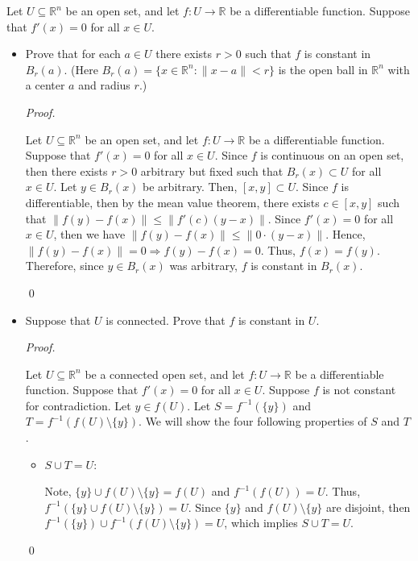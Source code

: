 \documentclass[12pt]{article}
\newenvironment{problem}[2][Problem]{\begin{trivlist}
\item[\hskip \labelsep {\bfseries #1}\hskip \labelsep {\bfseries
#2.}]}{\end{trivlist}}
\newenvironment{sol}
    {\emph{Proof.}
    }
    {
    \qed
    }
\begin{document}
  
  
  \begin{problem}{14}
  Let $U \subseteq \mathbb{R}^n$ be an open set, and let $f : U \to \mathbb{R}$ be a differentiable function. Suppose that $f'(x) = 0$ for all $x \in U$.
  
  \begin{itemize}
      \item[(a)] Prove that for each $a \in U$ there exists $r > 0$ such that $f$ is constant in $B_r(a)$. (Here $B_r(a) = \{x \in \mathbb{R}^n : \lVert x - a \rVert < r \}$ is the open ball in $\mathbb{R}^n$ with a center $a$ and radius $r$.)
      
      \begin{sol}
      Let $U \subseteq \mathbb{R}^n$ be an open set, and let $f : U \to \mathbb{R}$ be a differentiable function. Suppose that $f'(x) = 0$ for all $x \in U$. Since $f$ is continuous on an open set, then there exists $r > 0$ arbitrary but fixed such that $B_r(x) \subset U$ for all $x \in U$. Let $y \in B_r(x)$ be arbitrary. Then, $[x,y] \subset U$. Since $f$ is differentiable, then by the mean value theorem, there exists $c \in [x,y]$ such that $\lVert f(y) - f(x) \rVert \leq \lVert f'(c)(y-x) \rVert$. Since $f'(x) = 0$ for all $x \in U$, then we have $\lVert f(y) - f(x) \rVert \leq \lVert 0 \cdot (y - x) \rVert$. Hence, $\lVert f(y) - f(x) \rVert = 0 \Longrightarrow f(y) - f(x) = 0$. Thus, $f(x) = f(y)$. Therefore, since $y \in B_r(x)$ was arbitrary, $f$ is constant in $B_r(x)$.
      \end{sol}
      
      \item[(b)] Suppose that $U$ is connected. Prove that $f$ is constant in $U$.
      
      \begin{sol}
       Let $U \subseteq \mathbb{R}^n$ be a connected open set, and let $f : U \to \mathbb{R}$ be a differentiable function. Suppose that $f'(x) = 0$ for all $x \in U$. Suppose $f$ is not constant for contradiction. Let $y \in f(U)$. Let $S = f^{-1}(\{y\})$ and $T = f^{-1}(f(U) \setminus \{y\})$. We will show the four following properties of $S$ and $T$.
       
       \begin{itemize}
           \item[(i)] $S \cup T = U$:
           
           Note, $\{y\} \cup f(U) \setminus \{y\} = f(U)$ and $f^{-1}(f(U)) = U$. Thus, $f^{-1}(\{y\} \cup f(U) \setminus \{y\}) = U$. Since $\{y\}$ and $f(U) \setminus \{y\}$ are disjoint, then $f^{-1}(\{y\}) \cup f^{-1}(f(U) \setminus \{y\}) = U$, which implies $S \cup T = U$.
           

\end{itemize}
\end{sol}
\end{itemize}
\end{problem}
\end{document}
